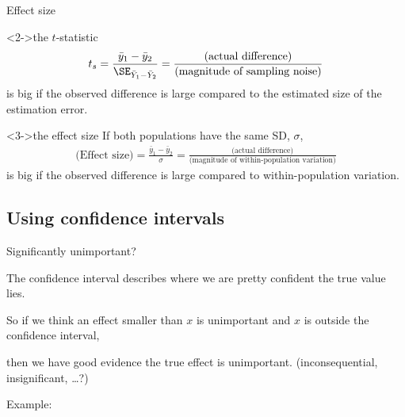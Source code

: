 \begin{frame}{Effect size}

    \begin{block}<2->{the $t$-statistic}
        \begin{align}
            t_s = \frac{\bar y_1 - \bar y_2}{ \SE_{\bar Y_1 - \bar Y_2} } 
            = \frac{ \text{(actual difference)} }{ \text{(magnitude of sampling noise)} }
        \end{align}
        is big if the observed difference is large compared to the estimated size of the \alert{estimation error}.
    \end{block}

    \begin{block}<3->{the effect size}
        If both populations have the same SD, $\sigma$,
        \begin{align}
            \text{(Effect size)} = \frac{\bar y_1 - \bar y_2}{ \sigma }
            = \frac{ \text{(actual difference)} }{ \text{(magnitude of within-population variation)} }
        \end{align}
        is big if the observed difference is large compared to \alert{within-population variation}.
    \end{block}

\end{frame}


\subsection{Using confidence intervals}

\begin{frame}{Significantly unimportant?}

    The \alert{confidence interval} describes where we are pretty confident the true value lies.

    \vspace{2em}

    So if we think an effect smaller than $x$ is \alert{unimportant}
    and $x$ is outside the confidence interval,

    \vspace{2em}

    then we have good evidence the true effect is unimportant.
    (inconsequential, insignificant, \ldots?)


    \vspace{2em}

    Example:


\end{frame}


